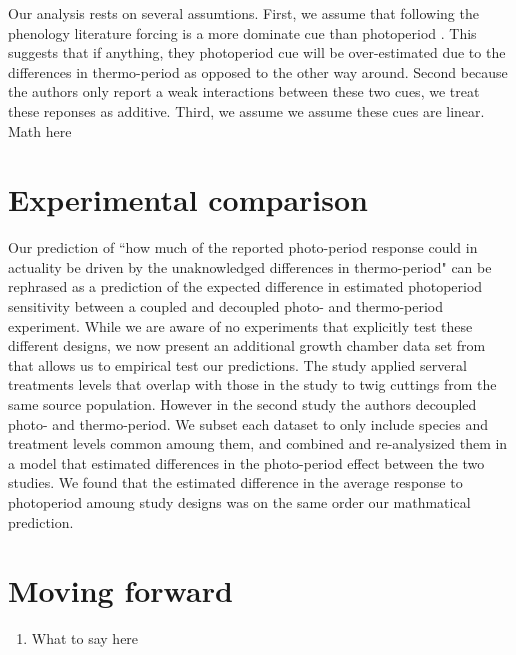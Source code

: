 \documentclass{article}[11pt]
\begin{document}
\noident Our analysis rests on several assumtions. First, we assume that following the phenology literature forcing is a more dominate cue than photoperiod \citep{}. This suggests that if anything, they photoperiod cue will be over-estimated due to the differences in thermo-period as opposed to the other way around. Second because the authors only report a weak interactions between these two cues, we treat these reponses as additive. Third, we assume we assume these cues are linear.\\

Math here

\section*{Experimental comparison}
\indent\indent Our prediction of ``how much of the reported photo-period response could in actuality be driven by the unaknowledged differences in thermo-period" can be rephrased as a prediction of the expected difference in estimated photoperiod sensitivity between a coupled and decoupled photo- and thermo-period experiment. While we are aware of no experiments that explicitly test these different designs, we now present an additional growth chamber data set from  \citet{Buonaiuto2020} that allows us to empirical test our predictions. The \citet{Buonaiuto} study applied serveral treatments levels that overlap with those in the \citet{Flynn2018} study to twig cuttings from the same source population. However in the second study the authors decoupled photo- and thermo-period. We subset each dataset to only include species and treatment levels common amoung them, and combined and re-analysized them in a model that estimated differences in the photo-period effect between the two studies. We found that the estimated difference in the average response to photoperiod amoung study designs  was on the same order our mathmatical prediction.\\

\section*{Moving forward}
\begin{enumerate}
\item What to say here
\end{enumerate}

 
\end{document}
